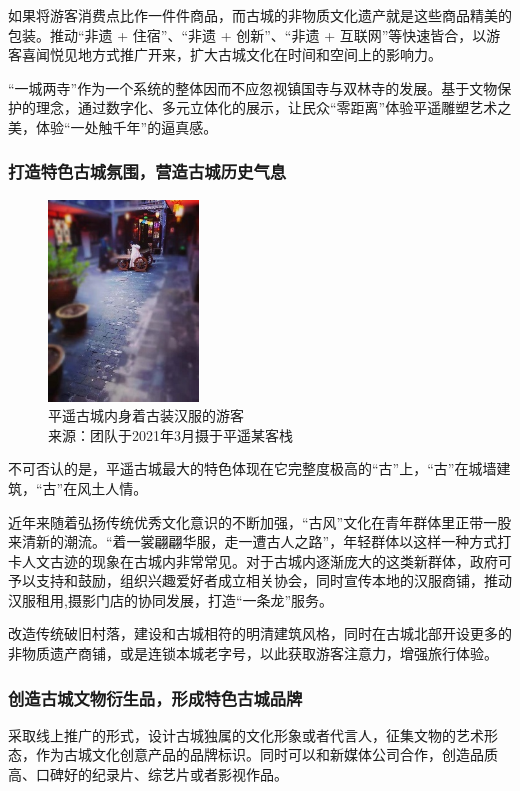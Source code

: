 \documentclass[UTF8]{ctexart}
\begin{document}
        如果将游客消费点比作一件件商品，而古城的非物质文化遗产就是这些商品精美的包装。推动“非遗 + 住宿”、“非遗 + 创新”、“非遗 + 互联网”等快速皆合，以游客喜闻悦见地方式推广开来，扩大古城文化在时间和空间上的影响力。
    
        “一城两寺”作为一个系统的整体因而不应忽视镇国寺与双林寺的发展。基于文物保护的理念，通过数字化、多元立体化的展示，让民众“零距离”体验平遥雕塑艺术之美，体验“一处触千年”的逼真感。
        \subsubsection{打造特色古城氛围，营造古城历史气息}
            \begin{figure}[H]
                \centering
                \includegraphics[width=4cm]{汉服.jpeg}
                \caption[plain]{平遥古城内身着古装汉服的游客\\来源：团队于2021年3月摄于平遥某客栈}
                \label{fig:my_label}
            \end{figure}
            不可否认的是，平遥古城最大的特色体现在它完整度极高的“古”上，“古”在城墙建筑，“古”在风土人情。
            
            近年来随着弘扬传统优秀文化意识的不断加强，“古风”文化在青年群体里正带一股来清新的潮流。“着一裳翩翩华服，走一遭古人之路”，年轻群体以这样一种方式打卡人文古迹的现象在古城内非常常见。对于古城内逐渐庞大的这类新群体，政府可予以支持和鼓励，组织兴趣爱好者成立相关协会，同时宣传本地的汉服商铺，推动汉服租用,摄影门店的协同发展，打造“一条龙”服务。
            
            改造传统破旧村落，建设和古城相符的明清建筑风格，同时在古城北部开设更多的非物质遗产商铺，或是连锁本城老字号，以此获取游客注意力，增强旅行体验。
        \subsubsection{创造古城文物衍生品，形成特色古城品牌}
            采取线上推广的形式，设计古城独属的文化形象或者代言人，征集文物的艺术形态，作为古城文化创意产品的品牌标识。同时可以和新媒体公司合作，创造品质高、口碑好的纪录片、综艺片或者影视作品。
            
\end{document}
